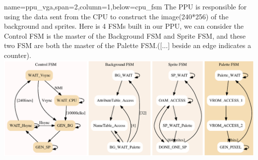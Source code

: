 \documentclass[fpga_paper,portrait]{baposter}
\begin{document}
\begin{poster}
{name=ppu_vga,span=2,column=1,below=cpu_fsm}{
The PPU is responsible for using the data sent from the CPU to construct the image(240*256) of the background and sprites. Here is 4 FSMs built in our PPU, we can consider the Control FSM is the master of the Background FSM and Sprite FSM, and these two FSM are both the master of the Palette FSM.([...] beside an edge indicates a counter).\\
\includegraphics[width=1.0\linewidth]{ppu_fsm}
}

\end{poster}
\end{document}

